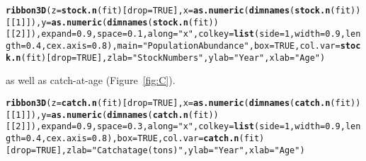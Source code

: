 \documentclass[a4paper,english,10pt]{article}\usepackage[]{graphicx}\usepackage[]{color}
\makeatletter
\newcommand{\hlnum}[1]{\textcolor[rgb]{0.686,0.059,0.569}{#1}}%
\newcommand{\hlstr}[1]{\textcolor[rgb]{0.192,0.494,0.8}{#1}}%
\newcommand{\hlstd}[1]{\textcolor[rgb]{0.345,0.345,0.345}{#1}}%
\newcommand{\hlkwc}[1]{\textcolor[rgb]{0.333,0.667,0.333}{#1}}%
\newcommand{\hlkwd}[1]{\textcolor[rgb]{0.737,0.353,0.396}{\textbf{#1}}}%
\newenvironment{kframe}{%
 \def\at@end@of@kframe{}%
 \ifinner\ifhmode%
  \def\at@end@of@kframe{\end{minipage}}%
  \begin{minipage}{\columnwidth}%
 \fi\fi%
 \def\FrameCommand##1{\hskip\@totalleftmargin \hskip-\fboxsep
 \colorbox{shadecolor}{##1}\hskip-\fboxsep
     \hskip-\linewidth \hskip-\@totalleftmargin \hskip\columnwidth}%
 \MakeFramed {\advance\hsize-\width
   \@totalleftmargin\z@ \linewidth\hsize
   \@setminipage}}%
 {\par\unskip\endMakeFramed%
 \at@end@of@kframe}
\newenvironment{knitrout}{}{} %
\makeatother
\begin{document}
\begin{knitrout}
\color{fgcolor}\begin{kframe}
\begin{alltt}
\hlkwd{ribbon3D}\hlstd{(} \hlkwc{z} \hlstd{=} \hlkwd{stock.n}\hlstd{(fit)[}\hlkwc{drop}\hlstd{=}\hlnum{TRUE}\hlstd{],} \hlkwc{x}\hlstd{=} \hlkwd{as.numeric}\hlstd{(}\hlkwd{dimnames}\hlstd{(}\hlkwd{stock.n}\hlstd{(fit))[[}\hlnum{1}\hlstd{]]),} \hlkwc{y}\hlstd{=} \hlkwd{as.numeric}\hlstd{(}\hlkwd{dimnames}\hlstd{(}\hlkwd{stock.n}\hlstd{(fit))[[}\hlnum{2}\hlstd{]]) ,} \hlkwc{expand} \hlstd{=} \hlnum{0.9}\hlstd{,} \hlkwc{space} \hlstd{=} \hlnum{0.1}\hlstd{,} \hlkwc{along} \hlstd{=} \hlstr{"x"}\hlstd{,} \hlkwc{colkey} \hlstd{=} \hlkwd{list}\hlstd{(} \hlkwc{side}\hlstd{=}\hlnum{1}\hlstd{,} \hlkwc{width} \hlstd{=} \hlnum{0.9}\hlstd{,} \hlkwc{length} \hlstd{=} \hlnum{0.4}\hlstd{,} \hlkwc{cex.axis} \hlstd{=} \hlnum{0.8}\hlstd{),} \hlkwc{main}\hlstd{=}\hlstr{"Population Abundance"} \hlstd{,} \hlkwc{box} \hlstd{=} \hlnum{TRUE}\hlstd{,} \hlkwc{col.var}\hlstd{=}\hlkwd{stock.n}\hlstd{(fit)[}\hlkwc{drop}\hlstd{=}\hlnum{TRUE}\hlstd{],}   \hlkwc{zlab}\hlstd{=}\hlstr{"Stock Numbers"}\hlstd{,} \hlkwc{ylab}\hlstd{=}\hlstr{"Year"}\hlstd{,} \hlkwc{xlab}\hlstd{=}\hlstr{"Age"}\hlstd{)}
\end{alltt}


{\ttfamily\noindent\bfseries{}}\end{kframe}
\end{knitrout}

as well as catch-at-age (Figure~\ref{fig:C}).

\begin{knitrout}
\color{fgcolor}\begin{kframe}
\begin{alltt}
\hlkwd{ribbon3D}\hlstd{(} \hlkwc{z} \hlstd{=} \hlkwd{catch.n}\hlstd{(fit)[}\hlkwc{drop}\hlstd{=}\hlnum{TRUE}\hlstd{],} \hlkwc{x}\hlstd{=} \hlkwd{as.numeric}\hlstd{(}\hlkwd{dimnames}\hlstd{(}\hlkwd{catch.n}\hlstd{(fit))[[}\hlnum{1}\hlstd{]]),} \hlkwc{y}\hlstd{=} \hlkwd{as.numeric}\hlstd{(}\hlkwd{dimnames}\hlstd{(}\hlkwd{catch.n}\hlstd{(fit))[[}\hlnum{2}\hlstd{]]) ,} \hlkwc{expand} \hlstd{=} \hlnum{0.9}\hlstd{,} \hlkwc{space} \hlstd{=} \hlnum{0.3}\hlstd{,} \hlkwc{along} \hlstd{=} \hlstr{"x"}\hlstd{,} \hlkwc{colkey} \hlstd{=} \hlkwd{list}\hlstd{(} \hlkwc{side}\hlstd{=}\hlnum{1}\hlstd{,} \hlkwc{width} \hlstd{=} \hlnum{0.9}\hlstd{,} \hlkwc{length} \hlstd{=} \hlnum{0.4}\hlstd{,} \hlkwc{cex.axis} \hlstd{=} \hlnum{0.8}\hlstd{),}\hlkwc{box} \hlstd{=} \hlnum{TRUE}\hlstd{,} \hlkwc{col.var}\hlstd{=}\hlkwd{catch.n}\hlstd{(fit)[}\hlkwc{drop}\hlstd{=}\hlnum{TRUE}\hlstd{] ,} \hlkwc{zlab}\hlstd{=}\hlstr{"Catch at age (tons)"}\hlstd{,} \hlkwc{ylab}\hlstd{=}\hlstr{"Year"}\hlstd{,} \hlkwc{xlab}\hlstd{=}\hlstr{"Age"}\hlstd{)}
\end{alltt}


{\ttfamily\noindent\bfseries{}}\end{kframe}
\end{knitrout}
\end{document}
